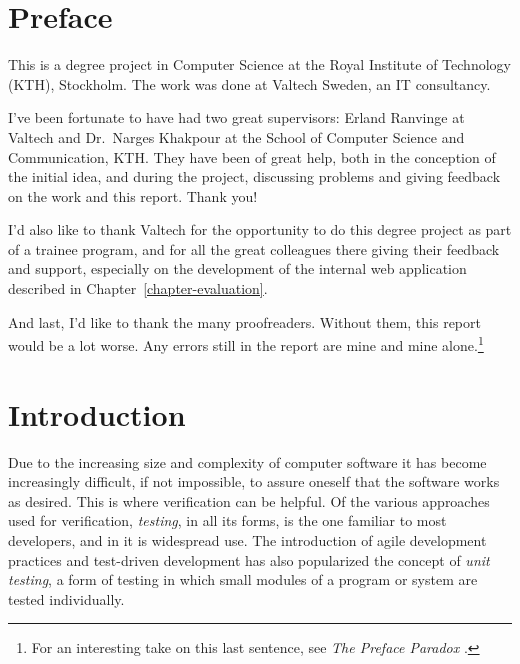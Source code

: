 \documentclass[a4paper,11pt]{kth-mag}
\begin{document}

\pagestyle{newchap}
\chapter*{Preface}

This is a degree project in Computer Science at the Royal Institute of
Technology (KTH), Stockholm. The work was done at Valtech Sweden, an IT
consultancy.

I've been fortunate to have had two great supervisors: Erland Ranvinge at
Valtech and Dr.\ Narges Khakpour at the School of Computer Science and
Communication, KTH\@. They have been of great help, both in the conception of
the initial idea, and during the project, discussing problems and giving
feedback on the work and this report. Thank you!

I'd also like to thank Valtech for the opportunity to do this degree project as
part of a trainee program, and for all the great colleagues there giving their
feedback and support, especially on the development of the internal web
application described in Chapter~\ref{chapter-evaluation}.

And last, I'd like to thank the many proofreaders. Without them, this report
would be a lot worse. Any errors still in the report are mine and mine
alone.\footnote{For an interesting take on this last sentence, see \emph{The
Preface Paradox} \cite{makinson65prefaceparadox,
williams87prefaceparadoxdissolved}.}

\clearpage

\pagestyle{newchap}
\tableofcontents*
\mainmatter





\pagestyle{newchap}
\chapter{Introduction} \label{chapter-introduction}

Due to the increasing size and complexity of computer software it has become
increasingly difficult, if not impossible, to assure oneself that the software
works as desired. This is where verification can be helpful. Of the various
approaches used for verification, \textit{testing}, in all its forms, is the
one familiar to most developers, and in it is widespread use. The introduction
of agile development practices and test-driven development has also popularized
the concept of \textit{unit testing}, a form of testing in which small modules
of a program or system are tested individually.
\end{document}
